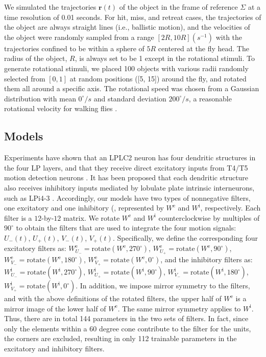 \documentclass[pdftex,9pt,lineno]{elife}
\begin{document}
We simulated the trajectories $\mathbf{r}(t)$ of the object in the frame of reference $\Sigma$ at a time resolution of 0.01 seconds. For hit, miss, and retreat cases, the trajectories of the object are always straight lines (i.e., ballistic motion), and the velocities of the object were randomly sampled from a range $[2R,10R](s^{-1})$ with the trajectories confined to be within a sphere of $5R$ centered at the fly head. The radius of the object, $R$, is always set to be 1 except in the rotational stimuli. To generate rotational stimuli, we placed 100 objects with various radii randomly selected from $[0,1]$ at random positions ([5, 15]) around the fly, and rotated them all around a specific axis. The rotational speed was chosen from a Gaussian distribution with mean $0^{\circ}/s$ and standard deviation $200^{\circ}/s$, a reasonable rotational velocity for walking flies \citep{deangelis2019manifold}.


\subsection{Models}
Experiments have shown that an LPLC2 neuron has four dendritic structures in the four LP layers, and that they receive direct excitatory inputs from T4/T5 motion detection neurons \citep{maisak2013directional,klapoetke2017ultra}. It has been proposed that each dendritic structure also receives inhibitory inputs mediated by lobulate plate intrinsic interneurons, such as LPi4-3 \citep{klapoetke2017ultra}. Accordingly, our models have two types of nonnegative filters, one excitatory and one inhibitory (, represented by $W^{\text{e}}$ and $W^{\text{i}}$, respectively. Each filter is a $12$-by-$12$ matrix. We rotate $W^{\text{e}}$ and $W^{\text{i}}$ counterclockwise by multiples of $90^{\circ}$ to obtain the filters that are used to integrate the four motion signals: $U_{-}(t)$, $U_{+}(t)$, $V_{-}(t)$, $V_{+}(t)$. Specifically, we define the corresponding four excitatory filters as: $W^{\text{e}}_{U_{-}}=\text{rotate}(W^{\text{e}},270^{\circ})$, $W^{\text{e}}_{U_{+}}=\text{rotate}(W^{\text{e}},90^{\circ})$, $W^{\text{e}}_{V_{-}}=\text{rotate}(W^{\text{e}},180^{\circ})$, $W^{\text{e}}_{V_{+}}=\text{rotate}(W^{\text{e}},0^{\circ})$, and the inhibitory filters as: $W^{\text{i}}_{U_{-}}=\text{rotate}(W^{\text{i}},270^{\circ})$, $W^{\text{i}}_{U_{+}}=\text{rotate}(W^{\text{i}},90^{\circ})$, $W^{\text{i}}_{V_{-}}=\text{rotate}(W^{\text{i}},180^{\circ})$, $W^{\text{i}}_{V_{+}}=\text{rotate}(W^{\text{i}},0^{\circ})$. In addition, we impose mirror symmetry to the filters, and with the above definitions of the rotated filters, the upper half of $W^{\text{e}}$ is a mirror image of the lower half of $W^{\text{e}}$. The same mirror symmetry applies to $W^{\text{i}}$. Thus, there are in total 144 parameters in the two sets of filters. In fact, since only the elements within a 60 degree cone contribute to the filter for the units, the corners are excluded, resulting in only 112 trainable parameters in the excitatory and inhibitory filters.
\end{document}

